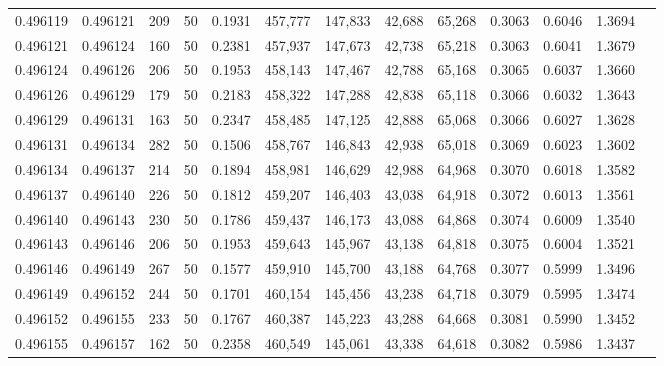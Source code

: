 \begin{tabular}{rrrrrrrrrrrrr}
0.496119 & 0.496121 &   209 &  50 &                                     0.1931 & 457,777 & 147,833 &  42,688 &  65,268 & 0.3063 & 0.6046 & 1.3694 \\
0.496121 & 0.496124 &   160 &  50 &                                     0.2381 & 457,937 & 147,673 &  42,738 &  65,218 & 0.3063 & 0.6041 & 1.3679 \\
0.496124 & 0.496126 &   206 &  50 &                                     0.1953 & 458,143 & 147,467 &  42,788 &  65,168 & 0.3065 & 0.6037 & 1.3660 \\
0.496126 & 0.496129 &   179 &  50 &                                     0.2183 & 458,322 & 147,288 &  42,838 &  65,118 & 0.3066 & 0.6032 & 1.3643 \\
0.496129 & 0.496131 &   163 &  50 &                                     0.2347 & 458,485 & 147,125 &  42,888 &  65,068 & 0.3066 & 0.6027 & 1.3628 \\
0.496131 & 0.496134 &   282 &  50 &                                     0.1506 & 458,767 & 146,843 &  42,938 &  65,018 & 0.3069 & 0.6023 & 1.3602 \\
0.496134 & 0.496137 &   214 &  50 &                                     0.1894 & 458,981 & 146,629 &  42,988 &  64,968 & 0.3070 & 0.6018 & 1.3582 \\
0.496137 & 0.496140 &   226 &  50 &                                     0.1812 & 459,207 & 146,403 &  43,038 &  64,918 & 0.3072 & 0.6013 & 1.3561 \\
0.496140 & 0.496143 &   230 &  50 &                                     0.1786 & 459,437 & 146,173 &  43,088 &  64,868 & 0.3074 & 0.6009 & 1.3540 \\
0.496143 & 0.496146 &   206 &  50 &                                     0.1953 & 459,643 & 145,967 &  43,138 &  64,818 & 0.3075 & 0.6004 & 1.3521 \\
0.496146 & 0.496149 &   267 &  50 &                                     0.1577 & 459,910 & 145,700 &  43,188 &  64,768 & 0.3077 & 0.5999 & 1.3496 \\
0.496149 & 0.496152 &   244 &  50 &                                     0.1701 & 460,154 & 145,456 &  43,238 &  64,718 & 0.3079 & 0.5995 & 1.3474 \\
0.496152 & 0.496155 &   233 &  50 &                                     0.1767 & 460,387 & 145,223 &  43,288 &  64,668 & 0.3081 & 0.5990 & 1.3452 \\
0.496155 & 0.496157 &   162 &  50 &                                     0.2358 & 460,549 & 145,061 &  43,338 &  64,618 & 0.3082 & 0.5986 & 1.3437 \\

\end{tabular}
